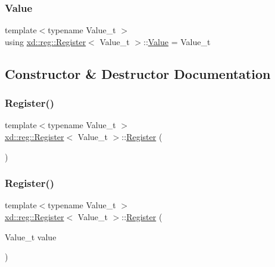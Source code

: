 \subsubsection{\texorpdfstring{Value}{Value}}
{\footnotesize\ttfamily template$<$typename Value\+\_\+t $>$ \\
using \mbox{\hyperlink{structxd_1_1reg_1_1_register}{xd\+::reg\+::\+Register}}$<$ Value\+\_\+t $>$\+::\mbox{\hyperlink{structxd_1_1reg_1_1_register_a34f223cf12e3397d03ad34f54d634edd}{Value}} =  Value\+\_\+t}



\subsection{Constructor \& Destructor Documentation}
\mbox{\label{structxd_1_1reg_1_1_register_a80781a5112e37e03a6b3d7ad843ce608}} 
\subsubsection{\texorpdfstring{Register()}{Register()}\hspace{0.1cm}{\footnotesize\ttfamily [1/2]}}
{\footnotesize\ttfamily template$<$typename Value\+\_\+t $>$ \\
\mbox{\hyperlink{structxd_1_1reg_1_1_register}{xd\+::reg\+::\+Register}}$<$ Value\+\_\+t $>$\+::\mbox{\hyperlink{structxd_1_1reg_1_1_register}{Register}} (\begin{DoxyParamCaption}{ }\end{DoxyParamCaption})\hspace{0.3cm}{\ttfamily [inline]}}

\mbox{\label{structxd_1_1reg_1_1_register_a0de38ec43de753e0038f14ab7bc0cd6e}} 
\subsubsection{\texorpdfstring{Register()}{Register()}\hspace{0.1cm}{\footnotesize\ttfamily [2/2]}}
{\footnotesize\ttfamily template$<$typename Value\+\_\+t $>$ \\
\mbox{\hyperlink{structxd_1_1reg_1_1_register}{xd\+::reg\+::\+Register}}$<$ Value\+\_\+t $>$\+::\mbox{\hyperlink{structxd_1_1reg_1_1_register}{Register}} (\begin{DoxyParamCaption}\item[{Value\+\_\+t}]{value }\end{DoxyParamCaption})\hspace{0.3cm}{\ttfamily [inline]}}



